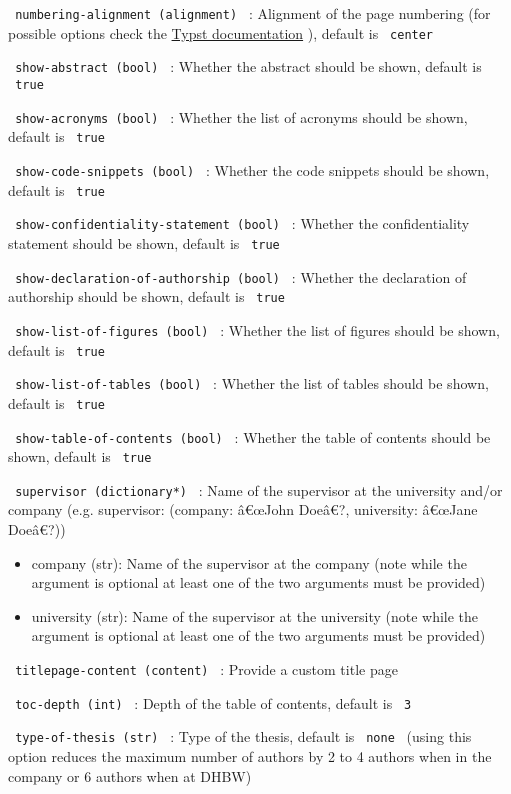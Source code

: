 \texttt{\ numbering-alignment\ (alignment)\ } : Alignment of the page
numbering (for possible options check the
\href{https://typst.app/docs/reference/layout/alignment/}{Typst
documentation} ), default is \texttt{\ center\ }

\texttt{\ show-abstract\ (bool)\ } : Whether the abstract should be
shown, default is \texttt{\ true\ }

\texttt{\ show-acronyms\ (bool)\ } : Whether the list of acronyms should
be shown, default is \texttt{\ true\ }

\texttt{\ show-code-snippets\ (bool)\ } : Whether the code snippets
should be shown, default is \texttt{\ true\ }

\texttt{\ show-confidentiality-statement\ (bool)\ } : Whether the
confidentiality statement should be shown, default is \texttt{\ true\ }

\texttt{\ show-declaration-of-authorship\ (bool)\ } : Whether the
declaration of authorship should be shown, default is \texttt{\ true\ }

\texttt{\ show-list-of-figures\ (bool)\ } : Whether the list of figures
should be shown, default is \texttt{\ true\ }

\texttt{\ show-list-of-tables\ (bool)\ } : Whether the list of tables
should be shown, default is \texttt{\ true\ }

\texttt{\ show-table-of-contents\ (bool)\ } : Whether the table of
contents should be shown, default is \texttt{\ true\ }

\texttt{\ supervisor\ (dictionary*)\ } : Name of the supervisor at the
university and/or company (e.g. supervisor: (company: â€œJohn Doeâ€?,
university: â€œJane Doeâ€?))

\begin{itemize}
\tightlist
\item
  company (str): Name of the supervisor at the company (note while the
  argument is optional at least one of the two arguments must be
  provided)
\item
  university (str): Name of the supervisor at the university (note while
  the argument is optional at least one of the two arguments must be
  provided)
\end{itemize}

\texttt{\ titlepage-content\ (content)\ } : Provide a custom title page

\texttt{\ toc-depth\ (int)\ } : Depth of the table of contents, default
is \texttt{\ 3\ }

\texttt{\ type-of-thesis\ (str)\ } : Type of the thesis, default is
\texttt{\ none\ } (using this option reduces the maximum number of
authors by 2 to 4 authors when in the company or 6 authors when at DHBW)

